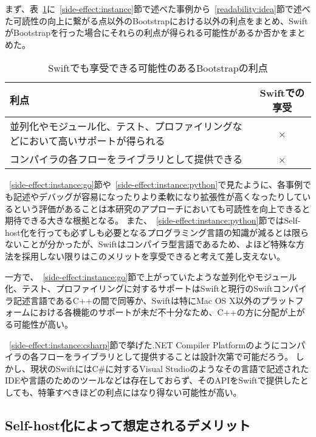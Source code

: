 まず、表~\ref{table:bootstrap-merit}に~\ref{side-effect:instance}節で述べた事例から~\ref{readability:idea}節で述べた可読性の向上に繋がる点以外のBootstrapにおける以外の利点をまとめ、SwiftがBootstrapを行った場合にそれらの利点が得られる可能性があるか否かをまとめた。

\begin{table}[hb]
    \begin{center}
        \caption{Swiftでも享受できる可能性のあるBootstrapの利点}
        \begin{tabular}{|m{10cm}|c|}
            \hline
            利点 & Swiftでの享受 \\
            \hline
            並列化やモジュール化、テスト、プロファイリングなどにおいて高いサポートが得られる & × \\
            \hline
            コンパイラの各フローをライブラリとして提供できる & × \\
            \hline
        \end{tabular}
        \label{table:bootstrap-merit}
    \end{center}
\end{table}


~\ref{side-effect:instance:go}節や~\ref{side-effect:instance:python}で見たように、各事例でも記述やデバッグが容易になったりより柔軟になり拡張性が高くなったりしているという評価があることは本研究のアプローチにおいても可読性を向上できると期待できる大きな根拠となる。
また、~\ref{side-effect:instance:python}節ではSelf-host化を行っても必ずしも必要となるプログラミング言語の知識が減るとは限らないことが分かったが、Swiftはコンパイラ型言語であるため、よほど特殊な方法を採用しない限りはこのメリットを享受できると考えて差し支えない。

一方で、~\ref{side-effect:instance:go}節で上がっていたような並列化やモジュール化、テスト、プロファイリングに対するサポートはSwiftと現行のSwiftコンパイラ記述言語であるC++の間で同等か、Swiftは特にMac OS X以外のプラットフォームにおける各機能のサポートが未だ不十分なため、C++の方に分配が上がる可能性が高い。

~\ref{side-effect:instance:csharp}節で挙げた.NET Compiler Platformのようにコンパイラの各フローをライブラリとして提供することは設計次第で可能だろう。
しかし、現状のSwiftにはC\#に対するVisual Studioのようなその言語で記述されたIDEや言語のためのツールなどは存在しておらず、そのAPIをSwiftで提供したとしても、特筆すべきほどの利点にはなり得ない可能性が高い。

\subsection{Self-host化によって想定されるデメリット}
\label{side-effect:swift:demerit}

